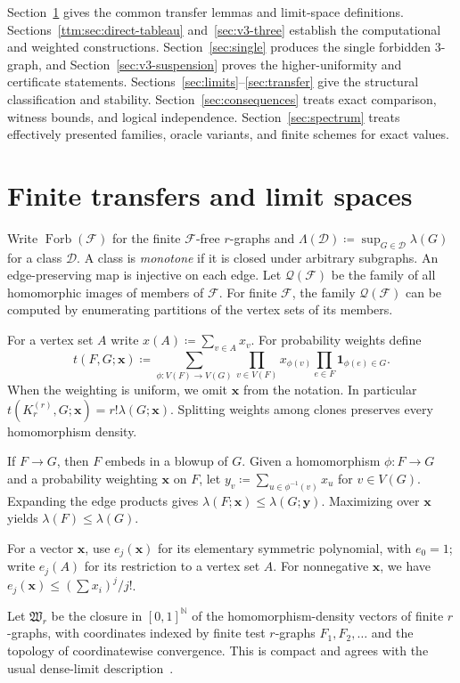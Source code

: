 \documentclass[10pt]{article}
\numberwithin{equation}{section}
\theoremstyle{definition}
\newcommand{\cD}{\mathcal D}\newcommand{\cE}{\mathcal E}\newcommand{\cF}{\mathcal F}
\newcommand{\cQ}{\mathcal Q}\newcommand{\cR}{\mathcal R}\newcommand{\cS}{\mathcal S}
\newcommand{\Forb}{\operatorname{Forb}}\newcommand{\Ext}{\operatorname{Ext}}
\newcommand{\x}{\boldsymbol{x}}\newcommand{\y}{\boldsymbol{y}}
\begin{document}
Section~\ref{sec:prelim} gives the common transfer lemmas and limit-space definitions. Sections~\ref{ttm:sec:direct-tableau} and~\ref{sec:v3-three} establish the computational and weighted constructions. Section~\ref{sec:single} produces the single forbidden $3$-graph, and Section~\ref{sec:v3-suspension} proves the higher-uniformity and certificate statements. Sections~\ref{sec:limits}--\ref{sec:transfer} give the structural classification and stability. Section~\ref{sec:consequences} treats exact comparison, witness bounds, and logical independence. Section~\ref{sec:spectrum} treats effectively presented families, oracle variants, and finite schemes for exact values.

\section{Finite transfers and limit spaces}\label{sec:prelim}
Write $\Forb(\cF)$ for the finite $\cF$-free $r$-graphs and $\Lambda(\cD)\coloneqq\sup_{G\in\cD}\lambda(G)$ for a class $\cD$. A class is \emph{monotone} if it is closed under arbitrary subgraphs. An edge-preserving map is injective on each edge. Let $\cQ(\cF)$ be the family of all homomorphic images of members of $\cF$. For finite $\cF$, the family $\cQ(\cF)$ can be computed by enumerating partitions of the vertex sets of its members.

For a vertex set $A$ write $x(A)\coloneqq\sum_{v\in A}x_v$. For probability weights define
\[
 t(F,G;\x)\coloneqq\sum_{\phi\colon V(F)\to V(G)}
   \prod_{v\in V(F)}x_{\phi(v)}\prod_{e\in F}\mathbf1_{\phi(e)\in G}.
\]
When the weighting is uniform, we omit $\x$ from the notation. In particular $t(K_r^{(r)},G;\x)=r!\lambda(G;\x)$. Splitting weights among clones preserves every homomorphism density.

If $F\to G$, then $F$ embeds in a blowup of $G$. Given a homomorphism $\phi\colon F\to G$ and a probability weighting $\x$ on $F$, let $y_v\coloneqq\sum_{u\in\phi^{-1}(v)}x_u$ for $v\in V(G)$. Expanding the edge products gives $\lambda(F;\x)\le\lambda(G;\y)$. Maximizing over $\x$ yields $\lambda(F)\le\lambda(G)$.

For a vector $\x$, use $e_j(\x)$ for its elementary symmetric polynomial, with $e_0=1$; write $e_j(A)$ for its restriction to a vertex set $A$. For nonnegative $\x$, we have $e_j(\x)\le(\sum x_i)^j/j!$.

Let $\mathfrak W_r$ be the closure in $[0,1]^{\mathbb N}$ of the homomorphism-density vectors of finite $r$-graphs, with coordinates indexed by finite test $r$-graphs $F_1,F_2,\ldots$ and the topology of coordinatewise convergence. This is compact and agrees with the usual dense-limit description~\cite{Austin2008,ElekSzegedy2012,Zhao2015}.
\end{document}
